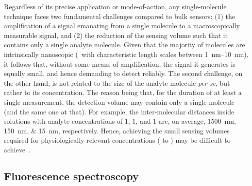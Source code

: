 Regardless of its precise application or mode-of-action, any single-molecule technique faces two fundamental
challenges compared to bulk sensors: (1) the amplification of a signal emanating from a single molecule to a
macroscopically measurable signal, and (2) the reduction of the sensing volume such that it contains only a
single analyte molecule. Given that the majority of molecules are intrinsically nanoscopic (\ie~with
characteristic length scales between \SIrange[range-phrase={ and }]{1}{10}{\nm}), it follows that, without
some means of amplification, the signal it generates is equally small, and hence demanding to detect reliably.
The second challenge, on the other hand, is not related to the size of the analyte molecule \textit{per se},
but rather to its concentration. The reason being that, for the duration of at least a single measurement, the
detection volume may contain only a single molecule (and the same one at that). For example, the
inter-molecular distances inside solutions with analyte concentrations of \SI{1}{\nM}, \SI{1}{\uM}, and
\SI{1}{\mM} are, on average, \SIlist{1500;150;15}{\nm}, respectively. Hence, achieving the small sensing
volumes required for physiologically relevant concentrations (\si{\uM} to \si{\mM}) may be difficult to
achieve~\cite{Zhu-2012}. 


\subsection{Fluorescence spectroscopy}
%

